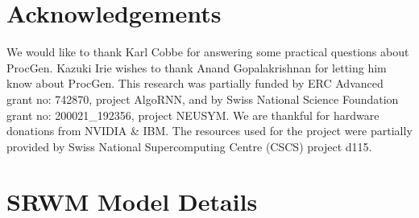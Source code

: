 \documentclass[nohyperref]{article}
\theoremstyle{plain}
\theoremstyle{definition}
\theoremstyle{remark}
\begin{document}
\section*{Acknowledgements}
We would like to thank Karl Cobbe for answering some practical questions about ProcGen.
Kazuki Irie wishes to thank Anand Gopalakrishnan for letting him know about ProcGen.
This research was partially funded by ERC Advanced grant no: 742870, project AlgoRNN,
and by Swiss National Science Foundation grant no: 200021\_192356, project NEUSYM.
We are thankful for hardware donations from NVIDIA \& IBM. The resources used for the project were partially provided by Swiss National Supercomputing Centre (CSCS) project d115.





\newpage
\appendix
\onecolumn




\section{SRWM Model Details}
\label{app:model}
\end{document}
